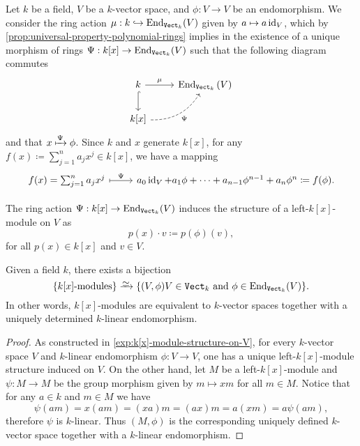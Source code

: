 \begin{example}
    \label{exp:k[x]-module-structure-on-V}
    Let \(k\) be a field, \(V\) be a \(k\)-vector space, and \(\phi: V \to V\) be an
    endomorphism. We consider the ring action \(\mu: k \hookrightarrow \operatorname{End}_{{\texttt{Vect}}_k}(V)\)
    given by \(a \mapsto a \operatorname{id}_V\), which by
    \cref{prop:universal-property-polynomial-rings} implies in the existence of a
    unique morphism of rings \(\Psi: k[x] \to \operatorname{End}_{{\texttt{Vect}}_k}(V)\) such that the
    following diagram commutes
    \[
        \begin{tikzcd}
            k \ar[d, hook] \ar[r, "\mu"] & \End_{\Vect_k}{(V)} \\
            k[x] \ar[ru, dashed, bend right, "\Psi"']&
        \end{tikzcd}
    \]
    and that \(x \xmapsto{\Psi} \phi\). Since \(k\) and \(x\) generate \(k[x]\), for
    any \(f(x) \coloneq \sum_{j=1}^n a_j x^j \in k[x]\), we have a mapping
    \[
        \begin{tikzcd}
            f(x) = \sum_{j=1}^n a_j x^j \ar[r, mapsto, "\Psi"]
            & a_0 \Id_V + a_1 \phi + \dots + a_{n-1} \phi^{n-1} + a_n \phi^n \coloneq f(\phi).
        \end{tikzcd}
    \]

    The ring action \(\Psi: k[x] \to \operatorname{End}_{{\texttt{Vect}}_k}(V)\) induces the structure of a
    left-\(k[x]\)-module on \(V\) as
    \[
        p(x) \cdot v \coloneq p(\phi)(v),
    \]
    for all \(p(x) \in k[x]\) and \(v \in V\).
\end{example}

\begin{corollary}
    \label{cor:k[x]-are-vector-spaces-with-endo}
    Given a field \(k\), there exists a bijection
    \[
        \{k[x]\text{-modules}\} \isoto
        \{(V, \phi) \colon V \in \Vect_k \text{ and } \phi \in \End_{\Vect_k}(V)\}.
    \]
    In other words, \(k[x]\)-modules are equivalent to \(k\)-vector spaces together
    with a uniquely determined \(k\)-linear endomorphism.
\end{corollary}

\begin{proof}
    As constructed in \cref{exp:k[x]-module-structure-on-V}, for every \(k\)-vector
    space \(V\) and \(k\)-linear endomorphism \(\phi: V \to V\), one has a unique
    left-\(k[x]\)-module structure induced on \(V\). On the other hand, let \(M\) be
    a left-\(k[x]\)-module and \(\psi: M \to M\) be the group morphism given by
    \(m \mapsto x m\) for all \(m \in M\). Notice that for any \(a \in k\) and
    \(m \in M\) we have
    \[
        \psi(a m) = x (a m) = (x a) m = (a x) m = a (x m) = a \psi(a m),
    \]
    therefore \(\psi\) is \(k\)-linear. Thus \((M, \phi)\) is the corresponding
    uniquely defined \(k\)-vector space together with a \(k\)-linear endomorphism.
\end{proof}

